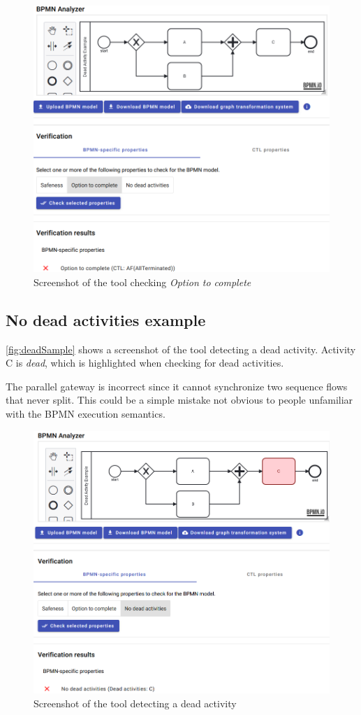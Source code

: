 \documentclass[runningheads]{llncs}
\begin{document}
\begin{figure}[ht]
    \centering
    \includegraphics[width=1\textwidth]{artifacts/option_to_complete_sample.png}
    \caption{Screenshot of the tool checking \textit{Option to complete}}
    \label{fig:optionToCompleteSample}
\end{figure}

\subsection{No dead activities example}
\autoref{fig:deadSample} shows a screenshot of the tool detecting a dead activity.
Activity C is \textit{dead}, which is highlighted when checking for dead activities.

The parallel gateway is incorrect since it cannot synchronize two sequence flows that never split.
This could be a simple mistake not obvious to people unfamiliar with the BPMN execution semantics.

\begin{figure}[ht]
    \centering
    \includegraphics[width=1\textwidth]{artifacts/dead_sample.png}
    \caption{Screenshot of the tool detecting a dead activity}
    \label{fig:deadSample}
\end{figure}
\end{document}
